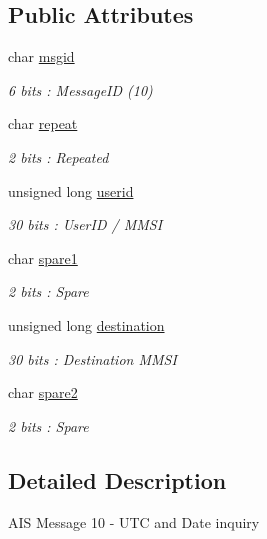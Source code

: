 \subsection*{Public Attributes}
\begin{DoxyCompactItemize}
\item 
char \mbox{\hyperlink{structaismsg__10_afb309efb8174b0c206d7b4c068f01f06}{msgid}}
\begin{DoxyCompactList}\small\item\em 6 bits \+: Message\+ID (10) \end{DoxyCompactList}\item 
char \mbox{\hyperlink{structaismsg__10_aada037b596e36d3974ded7c911356ce1}{repeat}}
\begin{DoxyCompactList}\small\item\em 2 bits \+: Repeated \end{DoxyCompactList}\item 
unsigned long \mbox{\hyperlink{structaismsg__10_aa62b226245d329c6707afc9872fc96ba}{userid}}
\begin{DoxyCompactList}\small\item\em 30 bits \+: User\+ID / M\+M\+SI \end{DoxyCompactList}\item 
char \mbox{\hyperlink{structaismsg__10_ae61b9178eee4ffc2985e2eb7ea6037fe}{spare1}}
\begin{DoxyCompactList}\small\item\em 2 bits \+: Spare \end{DoxyCompactList}\item 
unsigned long \mbox{\hyperlink{structaismsg__10_a59ddf19b05f2a8a2de2fb6399bef3575}{destination}}
\begin{DoxyCompactList}\small\item\em 30 bits \+: Destination M\+M\+SI \end{DoxyCompactList}\item 
char \mbox{\hyperlink{structaismsg__10_af4f70bcf92fc82e9676326292691dbd7}{spare2}}
\begin{DoxyCompactList}\small\item\em 2 bits \+: Spare \end{DoxyCompactList}\end{DoxyCompactItemize}


\subsection{Detailed Description}
A\+IS Message 10 -\/ U\+TC and Date inquiry 

